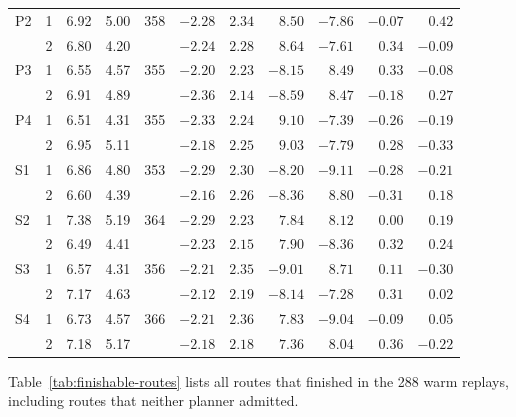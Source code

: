 \documentclass{ieeeaccess}
\begin{document}
\begin{table}[!t]
\begin{tabular}{@{}lrrrrrrrrrr@{}}
P2 & 1 & 6.92 & 5.00 & 358 & $-2.28$ & $2.34$ & $8.50$ & $-7.86$ & $-0.07$ & $0.42$ \\
 & 2 & 6.80 & 4.20 &  & $-2.24$ & $2.28$ & $8.64$ & $-7.61$ & $0.34$ & $-0.09$ \\
P3 & 1 & 6.55 & 4.57 & 355 & $-2.20$ & $2.23$ & $-8.15$ & $8.49$ & $0.33$ & $-0.08$ \\
 & 2 & 6.91 & 4.89 &  & $-2.36$ & $2.14$ & $-8.59$ & $8.47$ & $-0.18$ & $0.27$ \\
P4 & 1 & 6.51 & 4.31 & 355 & $-2.33$ & $2.24$ & $9.10$ & $-7.39$ & $-0.26$ & $-0.19$ \\
 & 2 & 6.95 & 5.11 &  & $-2.18$ & $2.25$ & $9.03$ & $-7.79$ & $0.28$ & $-0.33$ \\
\hline
S1 & 1 & 6.86 & 4.80 & 353 & $-2.29$ & $2.30$ & $-8.20$ & $-9.11$ & $-0.28$ & $-0.21$ \\
 & 2 & 6.60 & 4.39 &  & $-2.16$ & $2.26$ & $-8.36$ & $8.80$ & $-0.31$ & $0.18$ \\
S2 & 1 & 7.38 & 5.19 & 364 & $-2.29$ & $2.23$ & $7.84$ & $8.12$ & $0.00$ & $0.19$ \\
 & 2 & 6.49 & 4.41 &  & $-2.23$ & $2.15$ & $7.90$ & $-8.36$ & $0.32$ & $0.24$ \\
S3 & 1 & 6.57 & 4.31 & 356 & $-2.21$ & $2.35$ & $-9.01$ & $8.71$ & $0.11$ & $-0.30$ \\
 & 2 & 7.17 & 4.63 &  & $-2.12$ & $2.19$ & $-8.14$ & $-7.28$ & $0.31$ & $0.02$ \\
S4 & 1 & 6.73 & 4.57 & 366 & $-2.21$ & $2.36$ & $7.83$ & $-9.04$ & $-0.09$ & $0.05$ \\
 & 2 & 7.18 & 5.17 &  & $-2.18$ & $2.18$ & $7.36$ & $8.04$ & $0.36$ & $-0.22$ \\
\hline
\end{tabular}
\end{table}

Table~\ref{tab:finishable-routes} lists all routes that finished in the 288 warm replays, including routes that neither planner admitted.
\end{document}
